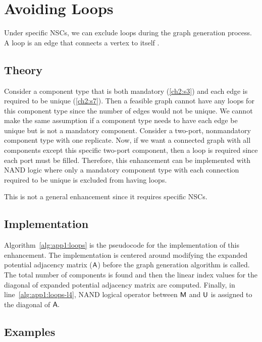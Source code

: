 \section{Avoiding Loops\label{sec:app1:loops}}

Under specific NSCs, we can exclude loops during the graph generation process. A loop is an edge that connects a vertex to itself \cite[p.~25]{Diestel2000a}. 

\subsection{Theory}

Consider a component type that is both mandatory (\ref{ch2:s3}) and each edge is required to be unique (\ref{ch2:s7}).
Then a feasible graph cannot have any loops for this component type since the number of edges would not be unique.
We cannot make the same assumption if a component type needs to have each edge be unique but is not a mandatory component.
Consider a two-port, nonmandatory component type with one replicate.
Now, if we want a connected graph with all components except this specific two-port component, then a loop is required since each port must be filled. Therefore, this enhancement can be implemented with NAND logic where only a mandatory component type with each connection required to be unique is excluded from having loops.

This is not a general enhancement since it requires specific NSCs.

\subsection{Implementation}



Algorithm~\ref{alg:app1:loops} is the pseudocode for the implementation of this enhancement.
The implementation is centered around modifying the expanded potential adjacency matrix ($\textup{\textsf{A}}$) before the graph generation algorithm is called.
The total number of components is found and then the linear index values for the diagonal of expanded potential adjacency matrix are computed.
Finally, in line~\ref{alg:app1:loops-l4}, NAND logical operator between $\textup{\textsf{M}}$ and $\textup{\textsf{U}}$ is assigned to the diagonal of $\textup{\textsf{A}}.$

\subsection{Examples}

